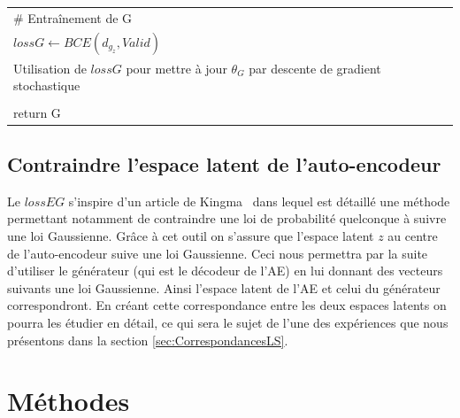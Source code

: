 \documentclass[11pt,francais]{article}
\begin{document}
\begin{table}[t!]
\begin{tabular}{l}
  \hspace{1cm}\# Entraînement de G\tabularnewline
  \hspace{1cm}\(lossG\leftarrow BCE(d_{g_z},Valid)\)\tabularnewline
  \hspace{1cm}Utilisation de \(lossG\) pour mettre à jour \(\theta_G\) par descente de gradient stochastique\tabularnewline
  \tabularnewline
  
  return G\tabularnewline
  \hline
  \end{tabular}
  \label{tab:tab2}
\end{table}


\subsection{Contraindre l'espace latent de l'auto-encodeur}
\label{sec:LatentSpace}
Le \(lossEG\) s'inspire d'un article de Kingma~\cite{kingma2013auto} dans lequel est détaillé une méthode permettant notamment de contraindre une loi de probabilité quelconque à suivre une loi Gaussienne. Grâce à cet outil on s'assure que l'espace latent \(z\) au centre de l'auto-encodeur suive une loi Gaussienne. Ceci nous permettra par la suite d'utiliser le générateur (qui est le décodeur de l'AE) en lui donnant des vecteurs suivants une loi Gaussienne. Ainsi l'espace latent de l'AE et celui du générateur correspondront.
En créant cette correspondance entre les deux espaces latents on pourra les étudier en détail, ce qui sera le sujet de l'une des expériences que nous présentons dans la section \ref{sec:CorrespondancesLS}.

\section{Méthodes}
\end{document}
